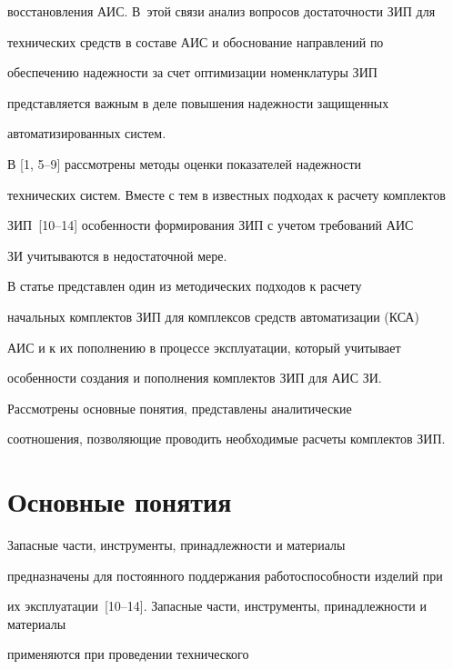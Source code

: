 восстановления АИС. В~этой связи анализ вопросов достаточности ЗИП для 


технических средств в составе АИС и обоснование направлений по 


обеспечению надежности за счет оптимизации номенклатуры ЗИП 


представляется важным в деле повышения надежности защищенных 


автоматизированных систем.


     


     В [1, 5--9] рассмотрены методы оценки показателей надежности 


технических систем. Вместе с тем в известных подходах к расчету комплектов 


ЗИП~[10--14] особенности формирования ЗИП с учетом требований АИС  


ЗИ учитываются в недостаточной мере.


     


     В статье представлен один из методических подходов к расчету 


начальных комплектов ЗИП для комплексов средств автоматизации (КСА) 


АИС и к их пополнению в процессе эксплуатации, который учитывает 


особенности создания и пополнения комплектов ЗИП для АИС ЗИ. 


Рассмотрены основные понятия, представлены аналитические 


соотношения, позволяющие проводить необходимые расчеты комплектов ЗИП.


     





\section{Основные понятия}





     Запасные части, инструменты, принадлежности и материалы  


предназначены для постоянного поддержания работоспособности изделий при 


их эксплуатации~[10--14].      Запасные части, инструменты, принадлежности и материалы 


 применяются при проведении технического 


